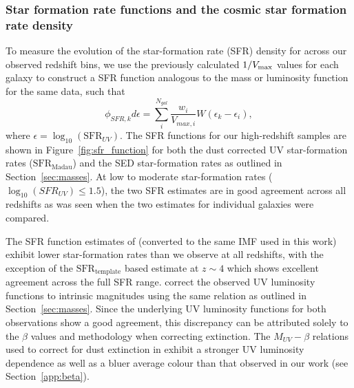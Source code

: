 \subsubsection{Star formation rate functions and the cosmic star formation rate density}
To measure the evolution of the star-formation rate (SFR) density for across our observed redshift bins, we use the previously calculated $1/V_{\rm{max}}$ values for each galaxy to construct a SFR function analogous to the mass or luminosity function for the same data, such that
\begin{equation}\label{eq:vmaxmethod_sfr}
\phi_{SFR,k}d\epsilon = \sum_{i}^{N_{gal}} \frac{w_{i}}{V_{max,i}}W(\epsilon_{k}-\epsilon_{i}),
\end{equation}
where $\epsilon = \log_{10}(\text{SFR}_{UV})$. The SFR functions for our high-redshift samples are shown in Figure~\ref{fig:sfr_function} for both the dust corrected UV star-formation rates ($\text{SFR}_{\text{Madau}}$) and the SED star-formation rates as outlined in Section~\ref{sec:masses}. At low to moderate star-formation rates ($\log_{10}(SFR_{UV}) \leq 1.5$), the two SFR estimates are in good agreement across all redshifts as was seen when the two estimates for individual galaxies were compared. 

The SFR function estimates of \citet{Smit:2012is} (converted to the same IMF used in this work) exhibit lower star-formation rates than we observe at all redshifts, with the exception of the $\text{SFR}_{\text{template}}$ based estimate at $z\sim4$ which shows excellent agreement across the full SFR range. \citet{Smit:2012is} correct the observed UV luminosity functions \citep{2007ApJ...670..928B,Anonymous:96uKWdy6} to intrinsic magnitudes using the same \citet{Meurer:1999jm} relation as outlined in Section~\ref{sec:masses}. Since the underlying UV luminosity functions for both observations show a good agreement, this discrepancy can be attributed solely to the $\beta$ values and methodology when correcting extinction. The \citet{2012ApJ...754...83B} $M_{UV}-\beta$ relations used to correct for dust extinction in \citet{Smit:2012is} exhibit a stronger UV luminosity dependence as well as a bluer average colour than that observed in our work (see Section~\ref{app:beta}). 

